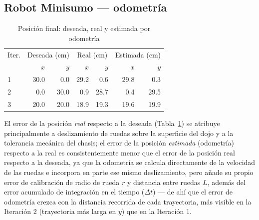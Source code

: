 \subsection{Robot Minisumo — odometría}

\begin{table}[!t]
\centering
\caption{Posición final: deseada, real y estimada por odometría}
\label{tab:posicion}
\small
\begin{tabular}{@{}l r r r r r r@{}}
\toprule
Iter. & \multicolumn{2}{c}{Deseada (cm)} & \multicolumn{2}{c}{Real (cm)} & \multicolumn{2}{c}{Estimada (cm)} \\
 & $x$ & $y$ & $x$ & $y$ & $x$ & $y$ \\
\midrule
1 & 30.0 & 0.0  & 29.2 & 0.6  & 29.8 & 0.3 \\
2 & 0.0  & 30.0 & 0.9  & 28.7 & 0.4  & 29.5 \\
3 & 20.0 & 20.0 & 18.9 & 19.3 & 19.6 & 19.9 \\
\bottomrule
\end{tabular}
\end{table}

El error de la posición \emph{real} respecto a la deseada (Tabla~\ref{tab:posicion}) se atribuye principalmente a deslizamiento de ruedas sobre la superficie del dojo y a la tolerancia mecánica del chasis; el error de la posición \emph{estimada} (odometría) respecto a la real es consistentemente menor que el error de la posición real respecto a la deseada, ya que la odometría se calcula directamente de la velocidad de las ruedas e incorpora en parte ese mismo deslizamiento, pero añade su propio error de calibración de radio de rueda $r$ y distancia entre ruedas $L$, además del error acumulado de integración en el tiempo ($\Delta t$) — de ahí que el error de odometría crezca con la distancia recorrida de cada trayectoria, más visible en la Iteración 2 (trayectoria más larga en $y$) que en la Iteración 1.

